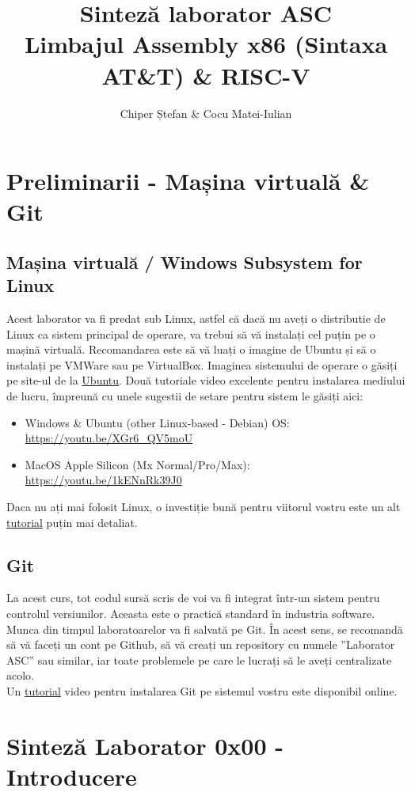\documentclass[12pt,a4paper]{article}
\title{Sinteză laborator ASC \\ \small Limbajul Assembly x86 (Sintaxa AT\&T) \& RISC-V}
\author{Chiper Ștefan \& Cocu Matei-Iulian}
\date{}
\begin{document}
\maketitle
\tableofcontents
\newpage

\section{Preliminarii - Mașina virtuală \& Git}
\subsection{Mașina virtuală / Windows Subsystem for Linux}
Acest laborator va fi predat sub Linux, astfel că dacă nu aveți o distributie de Linux ca sistem principal de operare, va trebui să vă instalați cel puțin pe o mașină virtuală. Recomandarea este să vă luați o imagine de Ubuntu și să o instalați pe VMWare sau pe VirtualBox. Imaginea sistemului de operare o găsiți pe site-ul de la \href{https://ubuntu.com/download/desktop}{Ubuntu}.
Două tutoriale video excelente pentru instalarea mediului de lucru, împreună cu unele sugestii de setare pentru sistem le găsiți aici: 
\begin{itemize}
    \item Windows \& Ubuntu (other Linux-based - Debian) OS: \url{https://youtu.be/XGr6_QV5moU}
    \item MacOS Apple Silicon (Mx Normal/Pro/Max): \url{https://youtu.be/1kENnRk39J0}
\end{itemize}
Daca nu ați mai folosit Linux, o investiție bună pentru viitorul vostru este un alt \href{https://www.youtube.com/watch?v=wBp0Rb-ZJak}{tutorial} puțin mai detaliat.

\subsection{Git}
La acest curs, tot codul sursă scris de voi va fi integrat într-un sistem pentru controlul versiunilor. Aceasta este o practică standard în industria software. Munca din timpul laboratoarelor va fi salvată pe Git. În acest sens, se recomandă să vă faceți un cont pe Github, să vă creați un repository cu numele ”Laborator ASC” sau similar, iar toate problemele pe care le lucrați să le aveți centralizate acolo. \\
Un \href{https://www.youtube.com/playlist?list=PL4cUxeGkcC9goXbgTDQ0n_4TBzOO0ocPR}{tutorial} video pentru instalarea Git pe sistemul vostru este disponibil online.

\section{Sinteză Laborator 0x00 - Introducere}
\end{document}
